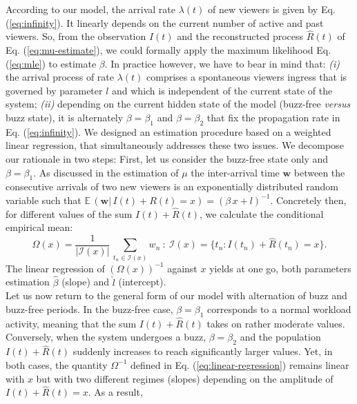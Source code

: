 \documentclass[twoside]{article}
\newcommand{\roy}[2]{#2}
\begin{document}
According to our model, the arrival rate $\lambda(t)$ of new viewers is given by \roy{equation}{Eq.} (\ref{eq:infinity}). It linearly depends on the current number of active and past viewers. So, from the observation $I(t)$ and the reconstructed process $\widehat{R}(t)$ of Eq. (\ref{eq:mu-estimate}), we could formally apply the maximum likelihood \roy{equation}{Eq.} (\ref{eq:mle}) to estimate $\beta$. In practice however, we have to bear in mind that: {\it (i)}  the arrival process of rate $\lambda(t)$  comprises a spontaneous viewers ingress that is governed by parameter $l$ and which is independent of the current state of the system; {\it (ii)} depending on the current hidden state of the model (buzz-free  {\it versus} buzz state), it is alternately $\beta=\beta_1$ and $\beta=\beta_2$ that fix the propagation rate in Eq. (\ref{eq:infinity}). 
We designed an estimation procedure based on a weighted linear regression, that simultaneously addresses these two issues.  We decompose our rationale in two steps: First, let us consider the buzz-free state only and $\beta=\beta_1$. As discussed in the estimation of $\mu$ the inter-arrival time $\mathbf{w}$ between the consecutive arrivals of two new viewers is an exponentially distributed random variable such that  $\mathbb{E}\,(\mathbf{w}|\,I(t)+R(t)=x) = (\beta\,x+l)^{-1}$. Concretely then, for different values of the sum $I(t)+\widehat{R}(t)$, we calculate the  conditional empirical mean:
\begin{equation}
{\Omega}(x) = \frac{1}{|\mathcal{I}(x)|}\,\sum_{t_n\in\mathcal{I}(x)} w_{n}~:~\mathcal{I}(x)=\{t_n:I(t_n)+\widehat{R}(t_n)=x\}.
\label{eq:linear-regression}
\end{equation}
The linear regression of $(\Omega(x))^{-1}$ against $x$ yields at one go, both parameters estimation $\widehat{\beta}$ (slope) and $\widehat{l}$ (intercept).\\
Let us now return to the general form of our model with alternation of buzz and  buzz-free periods. In the buzz-free case, $\beta=\beta_1$ corresponds to a normal workload activity, meaning that the sum $I(t)+\widehat{R}(t)$ takes on rather moderate values. Conversely, when the system undergoes a \roy{flash crowd}{buzz}, $\beta=\beta_2$ and the population $I(t)+\widehat{R}(t)$ suddenly increases to reach significantly larger values. Yet, in both cases, the quantity $\Omega^{-1}$ defined in Eq. (\ref{eq:linear-regression}) remains linear with $x$ but with two different regimes (slopes) depending on the amplitude of $I(t)+\widehat{R}(t)=x$. As a result, 
\end{document}
